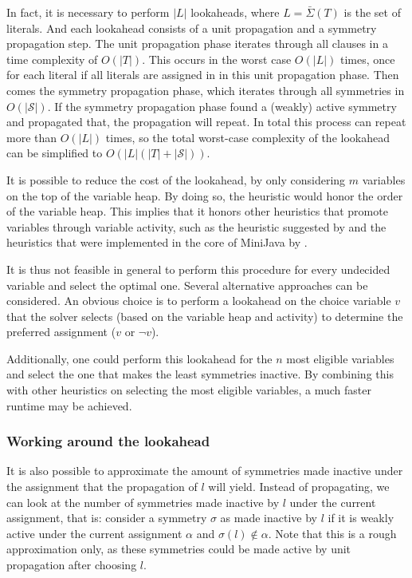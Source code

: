 	In fact, it is necessary to perform $|L|$ lookaheads, where $L = \bar{\Sigma}(T)$ is the set of literals.
	And each lookahead consists of a unit propagation and a symmetry propagation step.
	The unit propagation phase iterates through all clauses in a time complexity of $O(|T|)$.
	This occurs in the worst case $O(|L|)$ times,
	once for each literal if all literals are assigned in in this unit propagation phase.
	Then comes the symmetry propagation phase, which iterates through all symmetries in $O(|\mathcal{S}|)$.
	If the symmetry propagation phase found a (weakly) active symmetry and propagated that,
	the propagation will repeat.
	In total this process can repeat more than $O(|L|)$ times,
	so the total worst-case complexity of the lookahead can be simplified to $O(|L|(|T| + |\mathcal{S}|))$.

	It is possible to reduce the cost of the lookahead, by only considering $m$ variables on
	the top of the variable heap.
	By doing so, the heuristic would honor the order of the variable heap.
	This implies that it honors other heuristics that promote variables through variable activity,
	such as the heuristic suggested by \cite{devriendt2012symmetry} and the heuristics that were
	implemented in the core of MiniJava by \cite{een2004extensible}.

	It is thus not feasible in general to perform this procedure for every undecided variable and
	select the optimal one.
	Several alternative approaches can be considered.
	An obvious choice is to perform a lookahead on the choice variable $v$ that the solver
	selects (based on the variable heap and activity) to determine the
	preferred assignment ($v$ or $\neg v$).

	Additionally, one could perform this lookahead for the $n$ most eligible variables
	and select the one that makes the least symmetries inactive.
	By combining this with other heuristics on selecting the most eligible variables,
	a much faster runtime may be achieved.

	\subsubsection{Working around the lookahead}
		It is also possible to approximate the amount of symmetries made inactive under the
		assignment that the propagation of $l$ will yield.
		Instead of propagating, we can look at the number of symmetries made inactive by $l$
		under the current assignment, that is: consider a symmetry $\sigma$ as
		made inactive by $l$ if it is weakly active under the current assignment $\alpha$ and
		$\sigma(l) \notin \alpha$.
		Note that this is a rough approximation only, as these symmetries could be made active by
		unit propagation after choosing $l$.

